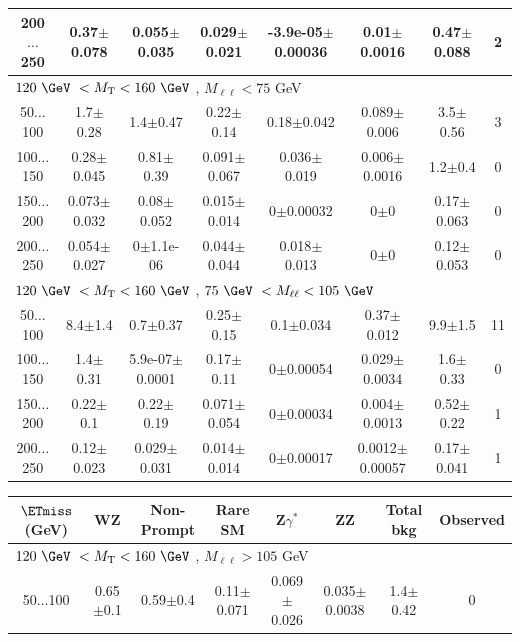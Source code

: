 \begin{landscape}
\begin{table}
\begin{center}
\begin{tabular}{| c | c c c c c c c | }
200$\dots$250&0.37$\pm$0.078&0.055$\pm$0.035&0.029$\pm$0.021&-3.9e-05$\pm$0.00036&0.01$\pm$0.0016&0.47$\pm$0.088&2\\
\hline\hline
\multicolumn{8}{l}{$120~\GeV~< M_{\text{T}} < 160~\GeV~$, $M_{\ell\ell} < 75$ GeV}\\\hline\hline
50$\dots$100&1.7$\pm$0.28&1.4$\pm$0.47&0.22$\pm$0.14&0.18$\pm$0.042&0.089$\pm$0.006&3.5$\pm$0.56&3\\
100$\dots$150&0.28$\pm$0.045&0.81$\pm$0.39&0.091$\pm$0.067&0.036$\pm$0.019&0.006$\pm$0.0016&1.2$\pm$0.4&0\\
150$\dots$200&0.073$\pm$0.032&0.08$\pm$0.052&0.015$\pm$0.014&0$\pm$0.00032&0$\pm$0&0.17$\pm$0.063&0\\
200$\dots$250&0.054$\pm$0.027&0$\pm$1.1e-06&0.044$\pm$0.044&0.018$\pm$0.013&0$\pm$0&0.12$\pm$0.053&0\\
\hline\hline
\multicolumn{8}{l}{$120~\GeV~< M_{\text{T}} < 160~\GeV~$, $75~\GeV~< M_{\ell\ell} < 105~\GeV~$}\\\hline\hline
50$\dots$100&8.4$\pm$1.4&0.7$\pm$0.37&0.25$\pm$0.15&0.1$\pm$0.034&0.37$\pm$0.012&9.9$\pm$1.5&11\\
100$\dots$150&1.4$\pm$0.31&5.9e-07$\pm$0.0001&0.17$\pm$0.11&0$\pm$0.00054&0.029$\pm$0.0034&1.6$\pm$0.33&0\\
150$\dots$200&0.22$\pm$0.1&0.22$\pm$0.19&0.071$\pm$0.054&0$\pm$0.00034&0.004$\pm$0.0013&0.52$\pm$0.22&1\\
200$\dots$250&0.12$\pm$0.023&0.029$\pm$0.031&0.014$\pm$0.014&0$\pm$0.00017&0.0012$\pm$0.00057&0.17$\pm$0.041&1\\
\hline\hline
\end{tabular}
\end{center}
\end{table}
\begin{table}
\begin{center}
\begin{tabular}{| c | c c c c c c c | }\hline\hline
$\ETmiss$ (GeV) & WZ & Non-Prompt & Rare SM & Z$\gamma^*$ & ZZ & Total bkg & Observed\\\hline\hline
\multicolumn{8}{l}{$120~\GeV~< M_{\text{T}} < 160~\GeV~$, $M_{\ell\ell} > 105$ GeV}\\\hline\hline
50$\dots$100&0.65$\pm$0.1&0.59$\pm$0.4&0.11$\pm$0.071&0.069$\pm$0.026&0.035$\pm$0.0038&1.4$\pm$0.42&0\\

\end{tabular}
\end{center}
\end{table}
\end{landscape}
